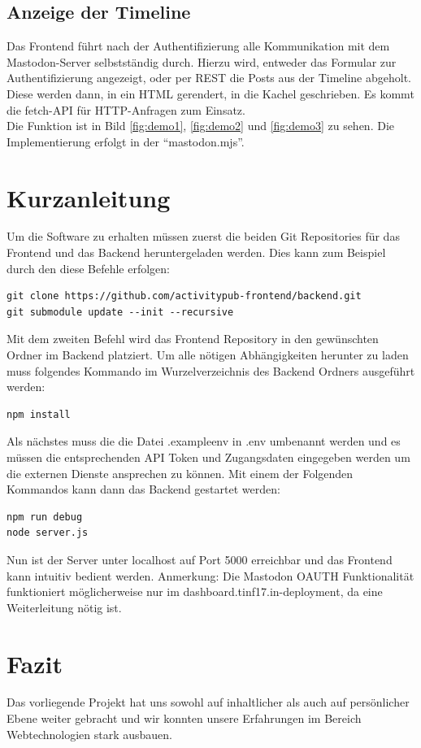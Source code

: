 \documentclass[fleqn,10pt]{SelfArx} %
\begin{document}
\subsection{Anzeige der Timeline}
Das Frontend führt nach der Authentifizierung alle Kommunikation mit dem Mastodon-Server selbstständig durch. Hierzu wird, entweder das Formular zur Authentifizierung angezeigt, oder per REST die Posts aus der Timeline abgeholt. Diese werden dann, in ein HTML gerendert, in die Kachel geschrieben. Es kommt die fetch-API für HTTP-Anfragen zum Einsatz. \\
Die Funktion ist in Bild \ref{fig:demo1}, \ref{fig:demo2} und \ref{fig:demo3} zu sehen. Die Implementierung erfolgt in der \enquote{mastodon.mjs}.
\section{Kurzanleitung}
Um die Software zu erhalten müssen zuerst die beiden Git Repositories für das Frontend und das Backend heruntergeladen werden. Dies kann zum Beispiel durch den diese Befehle erfolgen:
\begin{lstlisting}
git clone https://github.com/activitypub-frontend/backend.git
git submodule update --init --recursive
\end{lstlisting}
Mit dem zweiten Befehl wird das Frontend Repository in den gewünschten Ordner im Backend platziert.
Um alle nötigen Abhängigkeiten herunter zu laden muss folgendes Kommando im Wurzelverzeichnis des Backend Ordners ausgeführt werden:
\begin{lstlisting}
npm install
\end{lstlisting}
Als nächstes muss die die Datei .exampleenv in .env umbenannt werden und es müssen die entsprechenden API Token und Zugangsdaten eingegeben werden um die externen Dienste ansprechen zu können.
Mit einem der Folgenden Kommandos kann dann das Backend gestartet werden:
\begin{lstlisting}
npm run debug
node server.js
\end{lstlisting}
Nun ist der Server unter localhost auf Port 5000 erreichbar und das Frontend kann intuitiv bedient werden.
Anmerkung: Die Mastodon OAUTH Funktionalität funktioniert möglicherweise nur im dashboard.tinf17.in-deployment, da eine Weiterleitung nötig ist.
\section{Fazit}
Das vorliegende Projekt hat uns sowohl auf inhaltlicher als auch auf persönlicher Ebene weiter gebracht und wir konnten unsere Erfahrungen im Bereich Webtechnologien stark ausbauen.
\end{document}
